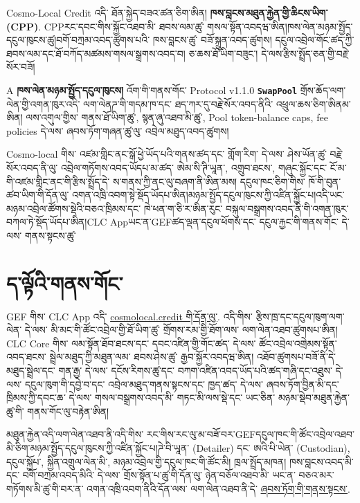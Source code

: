 \documentclass[11pt]{article}
\begin{document}
Cosmo-Local Credit འདི་ ཐོན་སྐྱེད་བཟའ་ཚན་ཅིག་ཨིན། \textbf{ཁས་བླངས་མཐུན་རྐྱེན་གྱི་ཆིངས་ཡིག་ (CPP)}. CPPརང་དབང་གིས་སྐྱོང་འཐབ་མི་ ཐབས་ལམ་ཚུ་ གསལ་སྟོན་འབདཝ་ཨིན།ཁས་ལེན་མཉམ་སྤྱོད་དངུལ་ཁུངས་ཚུ།བགོ་བཀྲམ་འབད་ཚུགས་པའི་ ཁས་བླངས་ཚུ་ བཟོ་སྐྲུན་འབད་ཚུགས། དངུལ་འབྲེལ་གོང་ཚད་ཀྱི་ ཐབས་ལམ་དང་ཐོ་བཀོད་མཚམས་གསལ་སྒྲགས་འབད་བ། ཅ་ཆས་ཐོ་ཡིག་བཟུང་། དེ་ལས་རྩིས་སྤྲོད་ཅན་གྱི་བརྗེ་སོར་བཟོ།

A \textbf{ཁས་ལེན་མཉམ་སྤྱོད་དངུལ་ཁུངས།} འོག་གི་གནས་གོང་ Protocol v1.1.0 \textbf{\texttt{SwapPool}} གྲོས་ཆོད་ལག་ལེན་གྱི་འགན་ཁུར་འདི་ ལག་ལེནཌ་གི་གདམ་ཁ་དང་ ཐད་ཀར་དུ་བརྗེ་སོར་འབད་ནིའི་ འཕྲུལ་ཆས་ཅིག་ཨིནམ་ཨིན། ལས་འགུལ་གྱིས་ གནས་ཐོ་ཡིག་ཚུ་, སྙན་ཞུ་འཐབ་མི་ཚུ་, Pool token-balance caps, fee policies དེ་ལས་ ཞབས་ཏོག་གཞན་ཚུ་ལུ་ འབྲེལ་མཐུད་འབད་ཚུགས།

Cosmo-local གིས་ འཛམ་གླིང་ནང་སྒོ་ཕྱེ་ཡོད་པའི་གནས་ཚད་དང་ གློག་རིག་ དེ་ལས་ ཤེས་ཡོན་ཚུ་ བརྗེ་སོར་འབད་ནི་ལུ་ འབྲེལ་གཏོགས་འབད་ཡོདཔ་མ་ཚད་ ཨེམ་སི་ཊི་ཡཱན་, འགྲུབ་ཐངས་, གཞུང་སྐྱོང་དང་ ངོ་མ་གི་འཛམ་གླིང་ནང་གི་རྩིས་སྤྲོད་དེ་ ས་གནས་ཀྱི་ནང་ལུ་བཞག་ནི་ཨིན་མས། དངུལ་ཁང་ཅིག་གིས་ ཁོ་གི་བུན་ཚབ་ཡིག་གི་དོན་ལུ་ འགན་འཁྲི་འབག་སྟེ་སྡོད་ཡོདཔ་ཨིན།མཉམ་སྤྱོད་དངུལ་ཁུངས་ཀྱི་འཛིན་སྐྱོང་པ།འདི་ཡང་ མཉམ་འབྲེལ་ཚོགས་སྡེའི་བཅའ་ཁྲིམས་དང་ ཁེ་ཕན་ག་ཅི་ར་ཨིན་རུང་ བསྐུལ་བསྒྲགས་འབད་ནི་གི་འགན་ཁུར་བཀལ་ཏེ་སྡོད་ཡོདཔ་ཨིན།CLC Appཡང་ན་GEFཚད་ལྡན་དངུལ་ཕོགས་དང་ དངུལ་རྐྱང་གི་གནས་གོང་ དེ་ལས་ གནས་སྟངས་ཚུ་

\section*{ད་ལྟོའི་གནས་གོང་}

GEF གིས་ CLC App འདི་ \href{https://cosmolocal.credit}{cosmolocal.credit གི་དོན་ལུ་}. འདི་གིས་ རྩིས་ཁྲ་དང་དངུལ་ཁུག་ལག་ལེན་ དེ་ལས་ མི་མང་གི་ཚོང་འབྲེལ་གྱི་ཐོ་ཡིག་ཚུ་ གྲོགས་རམ་གྱི་ཐོག་ལས་ ལག་ལེན་འཐབ་ཚུགསཔ་ཨིན། CLC Core གིས་ ལམ་སྟོན་ཐོབ་ཐངས་དང་ དབང་འཛིན་གྱི་གོང་ཚད་ དེ་ལས་ ཚོང་འབྲེལ་འགྲེམས་སྟོན་འབད་ཐངས་ སྦྲེལ་མཐུད་ཀྱི་མཐུན་ལམ་ ཐབས་ཤེས་ཚུ་ རྒྱབ་སྐྱོར་འབདཝ་ཨིན། འཐོབ་ཚུགསཔ་བཟོ་ནི་དེ་ མཐུད་སྦྲེལ་དང་ གན་རྒྱ་ དེ་ལས་ དངོས་རིགས་ཚུ་དང་ བཀག་འཛིན་འབད་ཡོད་པའི་ཚད་གཞི་དང་འཐུས་ དེ་ལས་ དངུལ་ཁུག་གི་དབྱེ་བ་དང་ འབྲེལ་མཐུད་གནས་སྟངས་དང་ ཁྱད་ཚད་ དེ་ལས་ ཞབས་ཏོག་བྱིན་མི་དང་ ཁྲིམས་ཀྱི་དབང་ཆ་ དེ་ལས་ གསལ་བསྒྲགས་འབད་མི་ གཏང་མི་ལས་སྡེ་དང་ ཡང་ཅིན་ མཉམ་སྡེབ་མཐུན་རྐྱེན་ཚུ་གི་ གནས་གོང་ལུ་བརྟེན་ཨིན།

མཐུན་རྐྱེན་འདི་ལག་ལེན་འཐབ་ནི་འདི་གིས་ རང་གིས་རང་ལུ་མ་བཟོ་བར་GEFདངུལ་ཁང་གི་ཚོང་འབྲེལ་འཐབ་མི་ཅིག་མཉམ་སྤྱོད་དངུལ་ཁུངས་ཀྱི་འཛིན་སྐྱོང་པ།ཌེ་བི་ཡཱན་ (Detailer) དང་ ཨའི་པི་ཡེན་ (Custodian), དངུལ་སྐྱོཔ་, སྐྱིན་འགྲུལ་ལེན་མི་, མཉམ་འབྲེལ་གྱི་དངུལ་ཁང་གི་ཚོང་མི། ཁྲལ་སྤྲོད་མཁན། ཁས་བླངས་འབད་མི་དང་ བགོ་བཀྲམ་འབད་མིའི་ དེ་ལས་ གྲོས་སྟོན་པ་ཚུ་གི་དོན་ལུ་ ཉེན་བཅོལ་འཐབ་མི་ ཡང་ན་ བཅའ་མར་གཏོགས་མི་ཚུ་གི་བར་ན་ འགན་འཁྲི་འབག་ནིའི་དོན་ལས་ ལག་ལེན་འཐབ་ནི་དེ་ \href{https://docs.cosmolocal.credit/dz/governance/terms}{ཞབས་ཏོག་གི་གནས་སྟངས་}.
\end{document}
